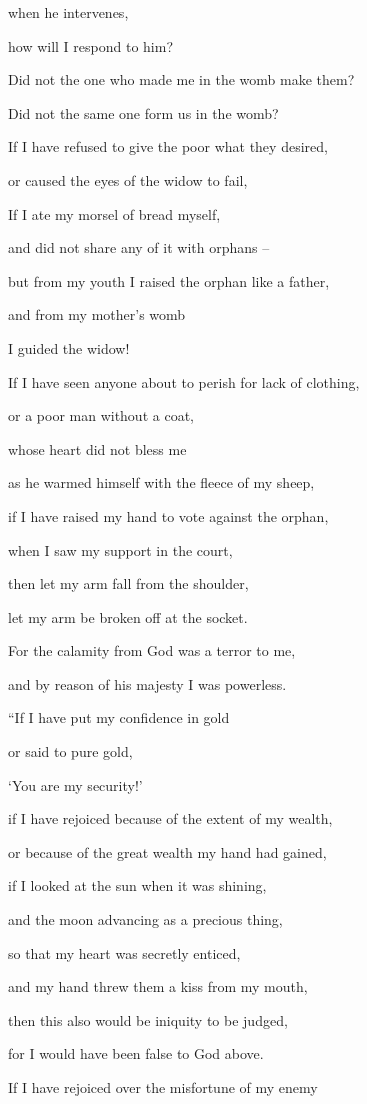 {\par }{\Q when
he intervenes,
\par }{\Q how
will I respond to him?
\par }{\Q {}Did not
the one who made
me in the womb
make
them?

\par }{\Q Did
not the same
one form
us in the womb?
\par }{\Q {}If
I have refused
to give the poor
what they desired,
\par }{\Q or caused the eyes
of the widow
to fail,
\par }{\Q {}If I ate
my morsel
of bread myself,
\par }{\Q and did not
share
any of it with
orphans –
\par }{\Q {}but
from my youth
I raised
the orphan like a father,
\par }{\Q and from my mother’s
womb
\par }{\Q I guided the widow!
\par }{\Q {}If
I have seen
anyone about to perish
for lack
of clothing,
\par }{\Q or a poor
man without
a coat,
\par }{\Q {}whose
heart did not
bless
me

\par }{\Q as he warmed
himself with the fleece
of my sheep,
\par }{\Q {}if
I have raised my hand
to vote
against
the orphan,
\par }{\Q when
I saw
my support
in the court,
\par }{\Q {}then let my arm
fall
from the shoulder,
\par }{\Q let my arm
be broken
off at the socket.
\par }{\Q {}For
the calamity
from God
was a terror
to me,
\par }{\Q and by reason of his majesty I was powerless.
\par }{\Q {}“If
I have put
my confidence
in gold
\par }{\Q or said
to pure gold,
\par }{\Q ‘You are my security!’
\par }{\Q {}if
I have rejoiced
because
of the extent
of my wealth,
\par }{\Q or because
of the great
wealth
my hand had gained,
\par }{\Q {}if
I looked
at the sun
when
it was shining,
\par }{\Q and the moon
advancing
as a precious thing,
\par }{\Q {}so that my heart
was secretly
enticed,
\par }{\Q and my hand
threw them a kiss
from my mouth,
\par }{\Q {}then this also
would be iniquity
to be judged,
\par }{\Q for
I would have been false
to God
above.
\par }{\Q {}If
I have rejoiced
over the misfortune
of my enemy

}
